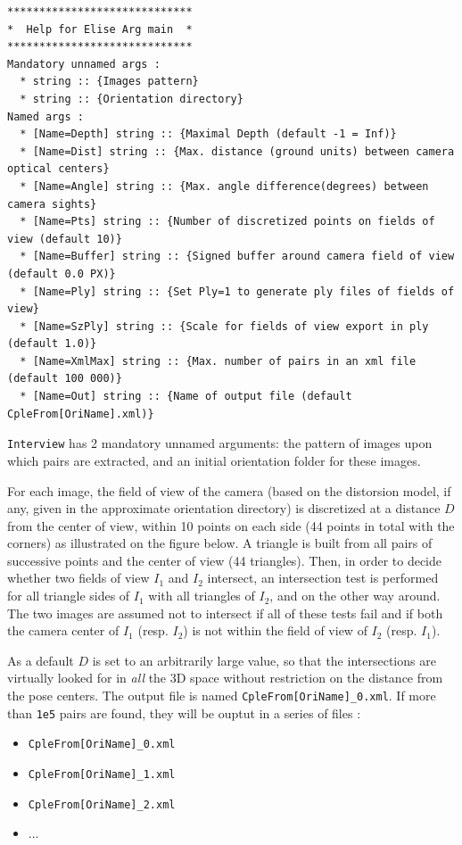  
\begin{verbatim}
*****************************
*  Help for Elise Arg main  *
*****************************
Mandatory unnamed args : 
  * string :: {Images pattern}
  * string :: {Orientation directory}
Named args : 
  * [Name=Depth] string :: {Maximal Depth (default -1 = Inf)}
  * [Name=Dist] string :: {Max. distance (ground units) between camera optical centers}
  * [Name=Angle] string :: {Max. angle difference(degrees) between camera sights}
  * [Name=Pts] string :: {Number of discretized points on fields of view (default 10)}
  * [Name=Buffer] string :: {Signed buffer around camera field of view (default 0.0 PX)}
  * [Name=Ply] string :: {Set Ply=1 to generate ply files of fields of view}
  * [Name=SzPly] string :: {Scale for fields of view export in ply (default 1.0)}
  * [Name=XmlMax] string :: {Max. number of pairs in an xml file (default 100 000)}
  * [Name=Out] string :: {Name of output file (default CpleFrom[OriName].xml)}
\end{verbatim}


\noindent \texttt{Interview} has 2 mandatory unnamed arguments: the pattern of images upon which pairs are extracted, and an initial orientation folder for these images. \newline

\noindent For each image, the field of view of the camera (based on the distorsion model, if any, given in the approximate orientation directory) is discretized at a distance $D$ from the center of view, within 10 points on each side (44 points in total with the corners) as illustrated on the figure below. A triangle is built from all pairs of successive points and the center of view (44 triangles). Then, in order to decide whether two fields of view $I_1$ and $I_2$ intersect, an intersection test is performed for all triangle sides of $I_1$ with all triangles of $I_2$, and on the other way around. The two images are assumed not to intersect if all of these tests fail and if both the camera center of $I_1$ (resp. $I_2$) is not within the field of view of $I_2$ (resp. $I_1$). \newline 

\noindent As a default $D$ is set to an arbitrarily large value, so that the intersections are virtually looked for in \textit{all} the 3D space without restriction on the distance from the pose centers. The output file is named \texttt{CpleFrom[OriName]\_0.xml}. If more than \texttt{1e5} pairs are found, they will be ouptut in a series of files : \newline
\begin{itemize}
\item \texttt{CpleFrom[OriName]\_0.xml}
\item \texttt{CpleFrom[OriName]\_1.xml}
\item \texttt{CpleFrom[OriName]\_2.xml}
\item ... \newline
\end{itemize}


